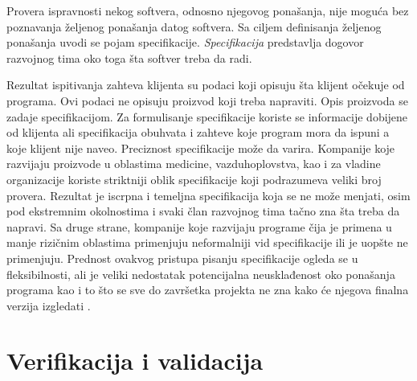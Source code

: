 \documentclass[12pt,oneside]{memoir}
\begin{document}
Provera ispravnosti nekog softvera, odnosno njegovog ponašanja, nije moguća bez poznavanja željenog ponašanja datog softvera. Sa ciljem definisanja željenog ponašanja uvodi se pojam specifikacije. \textit{Specifikacija} predstavlja dogovor razvojnog tima oko toga šta softver treba da radi. 

Rezultat ispitivanja zahteva klijenta su podaci koji opisuju šta klijent očekuje od programa. Ovi podaci ne opisuju proizvod koji treba napraviti. Opis proizvoda se zadaje specifikacijom. Za formulisanje specifikacije koriste se informacije dobijene od klijenta ali specifikacija obuhvata i zahteve koje program mora da ispuni a koje klijent nije naveo. Preciznost specifikacije može da varira. Kompanije koje razvijaju proizvode u oblastima medicine, vazduhoplovstva, kao i za vladine organizacije koriste striktniji oblik specifikacije koji podrazumeva veliki broj provera. Rezultat je iscrpna i temeljna specifikacija koja se ne može menjati, osim pod ekstremnim okolnostima i svaki član razvojnog tima tačno zna šta treba da napravi. Sa druge strane, kompanije koje razvijaju programe čija je primena u manje rizičnim oblastima primenjuju neformalniji vid specifikacije ili je uopšte ne primenjuju. Prednost ovakvog pristupa pisanju specifikacije ogleda se u fleksibilnosti, ali je veliki nedostatak potencijalna neusklađenost oko ponašanja programa kao i to što se sve do završetka projekta ne zna kako će njegova finalna verzija izgledati \cite{mvj, SoftTest}.


\section{Verifikacija i validacija}
\end{document}
